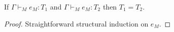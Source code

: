 \begin{muot}
\label{muot}
If $\Gamma\vdash_{M}e_{M}:T_{1}$ and $\Gamma\vdash_{M}e_{M}:T_{2}$ then $T_{1}=T_{2}$.
\begin{proof}
Straightforward structural induction on $e_{M}$.
\end{proof}
\end{muot}